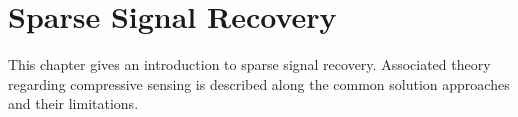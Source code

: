 \chapter{Sparse Signal Recovery}
This chapter gives an introduction to sparse signal recovery. Associated theory regarding compressive sensing is described along the common solution approaches and their limitations. 
    






